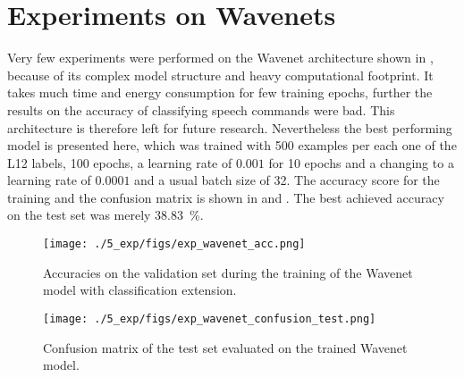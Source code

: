 
\section{Experiments on Wavenets}\label{exp_wavenet}
\thesisStateRevised
Very few experiments were performed on the Wavenet architecture shown in , because of its complex model structure and heavy computational footprint.
It takes much time and energy consumption for few training epochs, further the results on the accuracy of classifying speech commands were bad.
This architecture is therefore left for future research.
Nevertheless the best performing model is presented here, which was trained with 500 examples per each one of the L12 labels, 100 epochs, a learning rate of $0.001$ for 10 epochs and a changing to a learning rate of $0.0001$ and a usual batch size of 32.
The accuracy score for the training and the confusion matrix is shown in  and .
The best achieved accuracy on the test set was merely \SI{38.83}{\percent}.
\begin{figure}[!ht]
  \centering
  \texttt{[image: ./5\_exp/figs/exp\_wavenet\_acc.png]}
  \caption{Accuracies on the validation set during the training of the Wavenet model with classification extension.}
  \label{fig:exp_wavenet_acc}
\end{figure}
\begin{figure}[!ht]
  \centering
  \texttt{[image: ./5\_exp/figs/exp\_wavenet\_confusion\_test.png]}
  \caption{Confusion matrix of the test set evaluated on the trained Wavenet model.}
  \label{fig:exp_wavenet_confusion}
\end{figure}
\FloatBarrier
\noindent